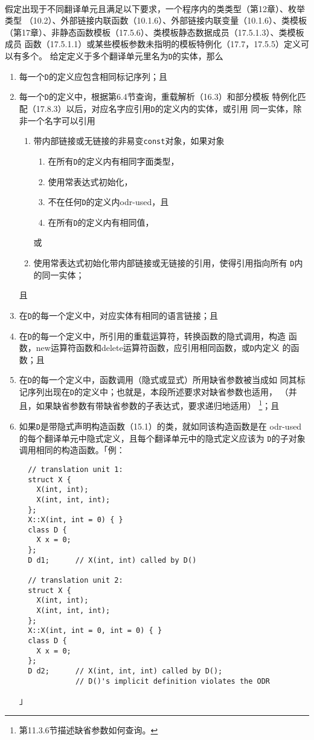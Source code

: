 \paragraph{}
假定出现于不同翻译单元且满足以下要求，一个程序内的类类型（第12章）、枚举类型
（10.2）、外部链接内联函数（10.1.6）、外部链接内联变量（10.1.6）、类模板
（第17章）、非静态函数模板（17.5.6）、类模板静态数据成员（17.5.1.3）、类模板成员
函数（17.5.1.1）或某些模板参数未指明的模板特例化（17.7，17.5.5）定义可以有多个。
给定定义于多个翻译单元里名为\texttt{D}的实体，那么
\begin{enumerate}
  \item{每一个\texttt{D}的定义应包含相同标记序列；且}
  \item{每一个\texttt{D}的定义中，根据第6.4节查询，重载解析（16.3）和部分模板
      特例化匹配（17.8.3）以后，对应名字应引用\texttt{D}的定义内的实体，或引用
      同一实体，除非一个名字可以引用
      \begin{enumerate}
        \item{带内部链接或无链接的非易变\texttt{const}对象，如果对象
            \begin{enumerate}
              \item{在所有\texttt{D}的定义内有相同字面类型，}
              \item{使用常表达式初始化，}
              \item{不在任何\texttt{D}的定义内odr-used，且}
              \item{在所有\texttt{D}的定义内有相同值，}
            \end{enumerate}
            或
          }
        \item{使用常表达式初始化带内部链接或无链接的引用，使得引用指向所有
          \texttt{D}内的同一实体；}
      \end{enumerate}
      且
    }
  \item{在\texttt{D}的每一个定义中，对应实体有相同的语言链接；且}
  \item{在\texttt{D}的每一个定义中，所引用的重载运算符，转换函数的隐式调用，构造
      函数，new运算符函数和delete运算符函数，应引用相同函数，或\texttt{D}内定义
      的函数；且}
  \item{在\texttt{D}的每一个定义中，函数调用（隐式或显式）所用缺省参数被当成如
    同其标记序列出现在\texttt{D}的定义中；也就是，本段所述要求对缺省参数也适用，
   （并且，如果缺省参数有带缺省参数的子表达式，要求递归地适用）
    \footnote{第11.3.6节描述缺省参数如何查询。}；且}
  \item{如果\texttt{D}是带隐式声明构造函数（15.1）的类，就如同该构造函数是在
      odr-used的每个翻译单元中隐式定义，且每个翻译单元中的隐式定义应该为
      \texttt{D}的子对象调用相同的构造函数。「例：
\begin{lstlisting}
  // translation unit 1:
  struct X {
    X(int, int);
    X(int, int, int);
  };
  X::X(int, int = 0) { }
  class D {
    X x = 0;
  };
  D d1;      // X(int, int) called by D()

  // translation unit 2:
  struct X {
    X(int, int);
    X(int, int, int);
  };
  X::X(int, int = 0, int = 0) { }
  class D {
    X x = 0;
  };
  D d2;      // X(int, int, int) called by D();
             // D()'s implicit definition violates the ODR
\end{lstlisting}」}
\end{enumerate}
